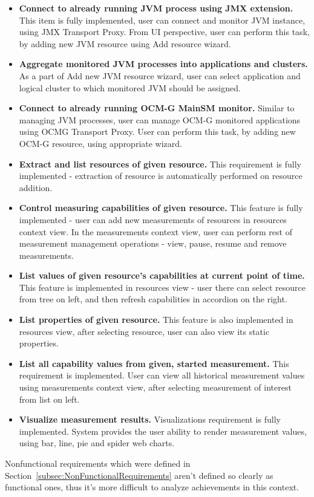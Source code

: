 \begin{itemize}
\item {\bf Connect to already running JVM process using JMX extension.} 
This item is fully implemented, user can connect and monitor JVM instance, using JMX Transport Proxy. From UI perspective, user can perform this task, by adding new JVM resource using Add resource wizard.
\item {\bf Aggregate monitored JVM processes into applications and clusters.}
As a part of Add new JVM resource wizard, user can select application and logical cluster to which monitored JVM should be assigned.
\item {\bf Connect to already running OCM-G MainSM monitor.}
Similar to managing JVM processes, user can manage OCM-G monitored applications using OCMG Transport Proxy. User can perform this task, by adding new OCM-G resource, using appropriate wizard.
\item {\bf Extract and list resources of given resource.}
This requirement is fully implemented - extraction of resource is automatically performed on resource addition.
\item {\bf Control measuring capabilities of given resource.}
This feature is fully implemented - user can add new measurements of resources in resources context view. In the measurements context view, user can perform rest of measurement management operations - view, pause, resume and remove measurements.
\item {\bf List values of given resource\rq{}s capabilities at current point of time.}
This feature is implemented in resources view - user there can select resource from tree on left, and then refresh capabilities in accordion on the right.
\item {\bf List properties of given resource.}
This feature is also implemented in resources view, after selecting resource, user can also view its static properties.
\item {\bf List all capability values from given, started measurement.}
This requirement is implemented. User can view all historical measurement values using measurements context view, after selecting measurement of interest from list on left.
\item {\bf Visualize measurement results.}
Visualizations requirement is fully implemented. System provides the user ability to render measurement values, using bar, line, pie and spider web charts.
\end{itemize}

Nonfunctional requirements which were defined in Section~\ref{subsec:NonFunctionalRequirements} aren\rq{}t defined so clearly as functional ones, thus it\rq{}s more difficult to analyze achievements in this context. 

